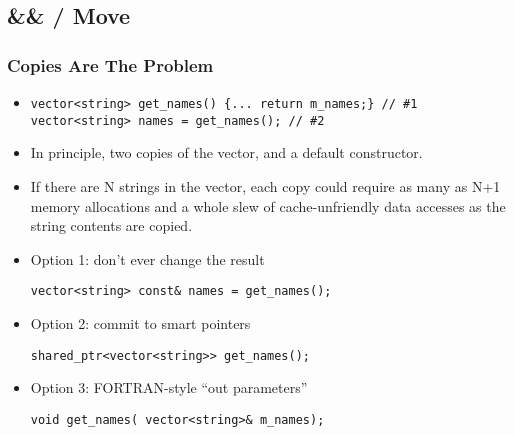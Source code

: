 
\subsection{\&\& / Move}\lyxframeend{}


\begin{frame}[fragile,t]
\frametitle{Copies Are The Problem}

\begin{itemize}

\item{\scriptsize
\begin{verbatim}
vector<string> get_names() {... return m_names;} // #1
vector<string> names = get_names(); // #2
\end{verbatim}
}

\item In principle, two copies of the vector, and a default constructor.

\item If there are N strings in the vector, each copy could require as many
as N+1 memory allocations and a whole slew of cache-unfriendly data
accesses as the string contents are copied.


\vskip 12pt
\item Option 1: don't ever change the result
{\scriptsize
\begin{verbatim}
vector<string> const& names = get_names();
\end{verbatim}
}

\vskip 12pt

\item Option 2: commit to smart pointers
{\scriptsize
\begin{verbatim}
shared_ptr<vector<string>> get_names();
\end{verbatim}
}
\vskip 12pt

\item Option 3: FORTRAN-style ``out parameters''
{\scriptsize
\begin{verbatim}
void get_names( vector<string>& m_names);
\end{verbatim}
}


\end{itemize}

\end{frame}


